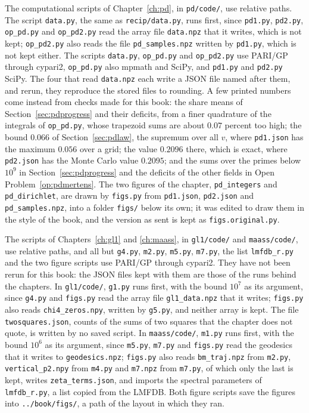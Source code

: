 The computational scripts of Chapter~\ref{ch:pd}, in \texttt{pd/code/}, use relative paths. The script \texttt{data.py}, the same as \texttt{recip/data.py}, runs first, since \texttt{pd1.py}, \texttt{pd2.py}, \texttt{op\_pd.py} and \texttt{op\_pd2.py} read the array file \texttt{data.npz} that it writes, which is not kept; \texttt{op\_pd2.py} also reads the file \texttt{pd\_samples.npz} written by \texttt{pd1.py}, which is not kept either. The scripts \texttt{data.py}, \texttt{op\_pd.py} and \texttt{op\_pd2.py} use PARI/GP through cypari2, \texttt{op\_pd.py} also mpmath and SciPy, and \texttt{pd1.py} and \texttt{pd2.py} SciPy. The four that read \texttt{data.npz} each write a JSON file named after them, and rerun, they reproduce the stored files to rounding. A few printed numbers come instead from checks made for this book: the share means of Section~\ref{sec:pdprogress} and their deficits, from a finer quadrature of the integrals of \texttt{op\_pd.py}, whose trapezoid sums are about $0.07$ percent too high; the bound $0.066$ of Section~\ref{sec:pdlaw}, the supremum over all $v$, where \texttt{pd1.json} has the maximum $0.056$ over a grid; the value $0.2096$ there, which is exact, where \texttt{pd2.json} has the Monte Carlo value $0.2095$; and the sums over the primes below $10^9$ in Section~\ref{sec:pdprogress} and the deficits of the other fields in Open Problem~\ref{op:pdmertens}. The two figures of the chapter, \texttt{pd\_integers} and \texttt{pd\_dirichlet}, are drawn by \texttt{figs.py} from \texttt{pd1.json}, \texttt{pd2.json} and \texttt{pd\_samples.npz}, into a folder \texttt{figs/} below its own; it was edited to draw them in the style of the book, and the version as sent is kept as \texttt{figs.original.py}.

The scripts of Chapters~\ref{ch:gl1} and \ref{ch:maass}, in \texttt{gl1/code/} and \texttt{maass/code/}, use relative paths, and all but \texttt{g4.py}, \texttt{m2.py}, \texttt{m5.py}, \texttt{m7.py}, the list \texttt{lmfdb\_r.py} and the two figure scripts use PARI/GP through cypari2. They have not been rerun for this book: the JSON files kept with them are those of the runs behind the chapters. In \texttt{gl1/code/}, \texttt{g1.py} runs first, with the bound $10^7$ as its argument, since \texttt{g4.py} and \texttt{figs.py} read the array file \texttt{gl1\_data.npz} that it writes; \texttt{figs.py} also reads \texttt{chi4\_zeros.npy}, written by \texttt{g5.py}, and neither array is kept. The file \texttt{twosquares.json}, counts of the sums of two squares that the chapter does not quote, is written by no saved script. In \texttt{maass/code/}, \texttt{m1.py} runs first, with the bound $10^6$ as its argument, since \texttt{m5.py}, \texttt{m7.py} and \texttt{figs.py} read the geodesics that it writes to \texttt{geodesics.npz}; \texttt{figs.py} also reads \texttt{bm\_traj.npz} from \texttt{m2.py}, \texttt{vertical\_p2.npy} from \texttt{m4.py} and \texttt{m7.npz} from \texttt{m7.py}, of which only the last is kept, writes \texttt{zeta\_terms.json}, and imports the spectral parameters of \texttt{lmfdb\_r.py}, a list copied from the LMFDB. Both figure scripts save the figures into \texttt{../book/figs/}, a path of the layout in which they ran.

